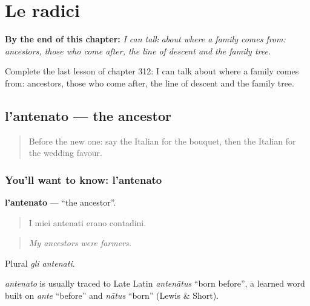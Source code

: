
\chapter{Le radici}
\label{ch:it-le-radici}

\begin{chapteropening}
\textbf{By the end of this chapter:} \emph{I can talk about where a family comes from: ancestors, those who come after, the line of descent and the family tree.}

Complete the last lesson of chapter 312: I can talk about where a family comes from: ancestors, those who come after, the line of descent and the family tree.
\end{chapteropening}

\section[l'antenato]{l'antenato — the ancestor}

\label{lesson:IT-C312-antenato}



\begin{quote}
Before the new one: say the Italian for the bouquet, then the Italian for the wedding favour.
\end{quote}

\subsection*{You'll want to know: l'antenato}
\textbf{l'antenato} — \textquotedblleft{}the ancestor\textquotedblright{}.

\begin{quote}
I miei antenati erano contadini.
\end{quote}

\begin{quote}
\emph{My ancestors were farmers.}
\end{quote}

Plural \emph{gli antenati}.

\begin{cousinweb}
\emph{antenato} is usually traced to Late Latin \emph{antenātus} \textquotedblleft{}born before\textquotedblright{}, a learned word built on \emph{ante} \textquotedblleft{}before\textquotedblright{} and \emph{nātus} \textquotedblleft{}born\textquotedblright{} (Lewis \& Short).
\end{cousinweb}

